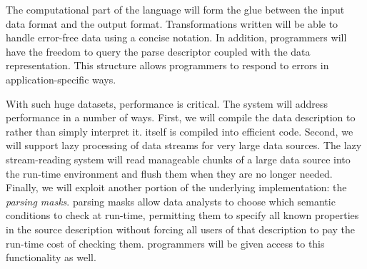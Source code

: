 \documentclass[11pt]{article}
\begin{document}
The computational part of the \datatype{} language will form the glue between
the input data format and the output format.  Transformations written
\datatype{} will be able to handle error-free data using a concise 
notation.  In addition, programmers will have the freedom to
query the parse descriptor coupled with the data representation. 
This structure allows programmers
to respond to errors in application-specific ways.

With such huge datasets, performance is critical. The \datatype{}
system will address performance in a number of ways.  First, we will
compile the data description to \pads{} rather than simply interpret
it. \pads{} itself is compiled into efficient \C{} code.  Second, we
will support lazy processing of data streams for very large data
sources.  The lazy stream-reading system will read manageable chunks
of a large data source into the run-time environment and flush them
when they are no longer needed.  Finally, we will exploit another
portion of the underlying \pads{} implementation: the \textit{parsing
masks}.  \pads{} parsing masks allow data analysts to choose which
semantic conditions to check at run-time, permitting them to specify
all known properties in the source description without forcing all
users of that description to pay the run-time cost of checking them.
\datatype{} programmers will be given access to this functionality as
well.


\end{document}

